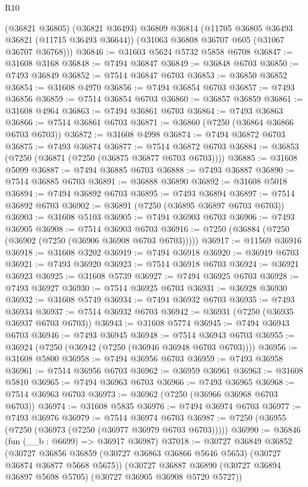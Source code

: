 \begin{lexlean}{R10}
\begin{coremodule}
      (@36821 @36805)
      (@36821 @36493)
      @36809
      @36814
      (@11705 @36805 @36493 @36821 (@11715 @36493 @36644))
      (@31063 @36808 @36707 @605 (@31067 @36707 @36768)))
@36846 := @31603 @5624 @5732 @5858 @6708
@36847 := @31608 @3168
@36848 := @7494 @36847
@36849 := @36848 @6703
@36850 := @7493 @36849
@36852 := @7514 @36847 @6703
@36853 := @36850 @36852
@36854 := @31608 @4970
@36856 := @7494 @36854 @6703
@36857 := @7493 @36856
@36859 := @7514 @36854 @6703
@36860 := @36857 @36859
@36861 := @31608 @4964
@36863 := @7494 @36861 @6703
@36864 := @7493 @36863
@36866 := @7514 @36861 @6703
@36871 := @36860 (@7250 (@36864 @36866 @6703 @6703))
@36872 := @31608 @4998
@36874 := @7494 @36872 @6703
@36875 := @7493 @36874
@36877 := @7514 @36872 @6703
@36884 := @36853 (@7250 (@36871 (@7250 (@36875 @36877 @6703 @6703))))
@36885 := @31608 @5099
@36887 := @7494 @36885 @6703
@36888 := @7493 @36887
@36890 := @7514 @36885 @6703
@36891 := @36888 @36890
@36892 := @31608 @5018
@36894 := @7494 @36892 @6703
@36895 := @7493 @36894
@36897 := @7514 @36892 @6703
@36902 := @36891 (@7250 (@36895 @36897 @6703 @6703))
@36903 := @31608 @5103
@36905 := @7494 @36903 @6703
@36906 := @7493 @36905
@36908 := @7514 @36903 @6703
@36916 := @7250 (@36884 (@7250 (@36902 (@7250 (@36906 @36908 @6703 @6703)))))
@36917 := @11569 @36916
@36918 := @31608 @3202
@36919 := @7494 @36918
@36920 := @36919 @6703
@36921 := @7493 @36920
@36923 := @7514 @36918 @6703
@36924 := @36921 @36923
@36925 := @31608 @5739
@36927 := @7494 @36925 @6703
@36928 := @7493 @36927
@36930 := @7514 @36925 @6703
@36931 := @36928 @36930
@36932 := @31608 @5749
@36934 := @7494 @36932 @6703
@36935 := @7493 @36934
@36937 := @7514 @36932 @6703
@36942 := @36931 (@7250 (@36935 @36937 @6703 @6703))
@36943 := @31608 @5774
@36945 := @7494 @36943 @6703
@36946 := @7493 @36945
@36948 := @7514 @36943 @6703
@36955 := @36924 (@7250 (@36942 (@7250 (@36946 @36948 @6703 @6703))))
@36956 := @31608 @5800
@36958 := @7494 @36956 @6703
@36959 := @7493 @36958
@36961 := @7514 @36956 @6703
@36962 := @36959 @36961
@36963 := @31608 @5810
@36965 := @7494 @36963 @6703
@36966 := @7493 @36965
@36968 := @7514 @36963 @6703
@36973 := @36962 (@7250 (@36966 @36968 @6703 @6703))
@36974 := @31608 @5835
@36976 := @7494 @36974 @6703
@36977 := @7493 @36976
@36979 := @7514 @36974 @6703
@36987 := @7250 (@36955 (@7250 (@36973 (@7250 (@36977 @36979 @6703 @6703)))))
@36990 := @36846 (fun (__b : @6699) => @36917 @36987)
@37018 := @30727
    @36849
    @36852
    (@30727 @36856 @36859 (@30727 @36863 @36866 @5646 @5653) (@30727 @36874 @36877 @5668 @5675))
    (@30727 @36887 @36890 (@30727 @36894 @36897 @5698 @5705) (@30727 @36905 @36908 @5720 @5727))

\end{coremodule}
\end{lexlean}
